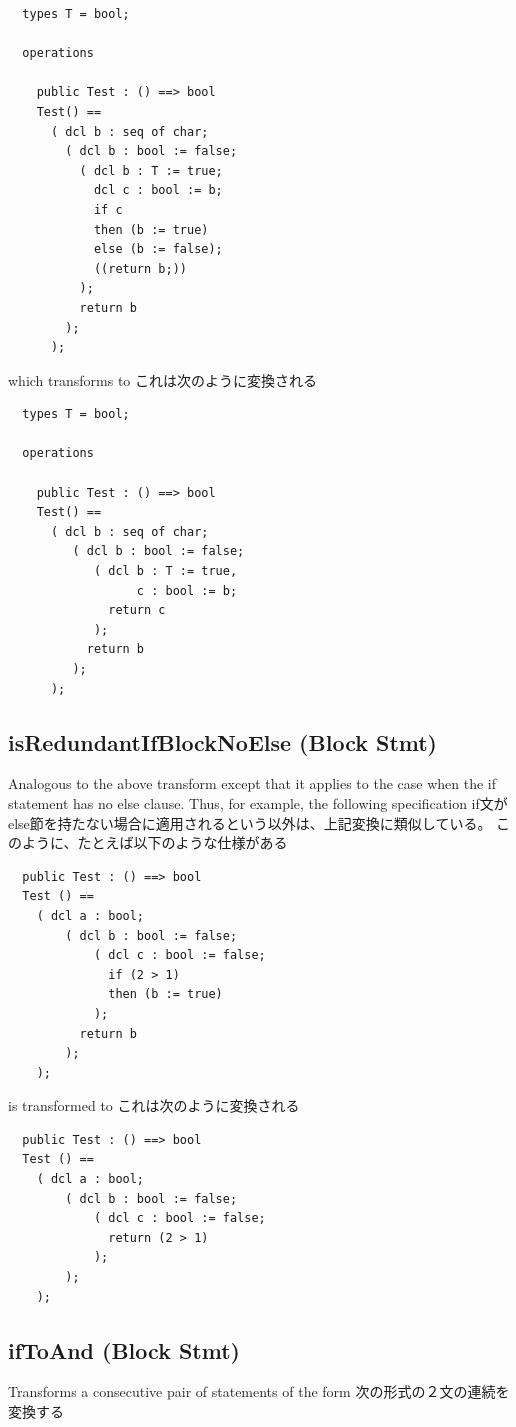 \documentclass[\pformat,12pt]{jarticle}
\begin{document}
\begin{verbatim}
  types T = bool;

  operations

    public Test : () ==> bool  
    Test() ==
      ( dcl b : seq of char;
        ( dcl b : bool := false;
          ( dcl b : T := true;
            dcl c : bool := b;
            if c
            then (b := true)
            else (b := false);
            ((return b;))
          );
          return b
        );
      );
\end{verbatim}

which transforms to
これは次のように変換される

\begin{verbatim}
  types T = bool;

  operations

    public Test : () ==> bool  
    Test() ==
      ( dcl b : seq of char;
         ( dcl b : bool := false;
            ( dcl b : T := true,
                  c : bool := b;
              return c
            );
           return b 
         ); 
      );
\end{verbatim}


\subsection{isRedundantIfBlockNoElse (Block Stmt)}
  Analogous to the above transform except that it applies to the case
  when the if statement has no else clause. Thus, for example, the
  following specification
if文がelse節を持たない場合に適用されるという以外は、上記変換に類似している。
このように、たとえば以下のような仕様がある

\begin{verbatim}
  public Test : () ==> bool  
  Test () ==
    ( dcl a : bool;
        ( dcl b : bool := false;
            ( dcl c : bool := false;
              if (2 > 1)
              then (b := true)
            );          
          return b
        );
    );
\end{verbatim}

is transformed to
これは次のように変換される

\begin{verbatim}
  public Test : () ==> bool  
  Test () ==
    ( dcl a : bool;
        ( dcl b : bool := false;
            ( dcl c : bool := false;
              return (2 > 1)
            );
        );
    );
\end{verbatim}

\subsection{ifToAnd (Block Stmt)}
  Transforms a consecutive pair of statements of the form
  次の形式の２文の連続を変換する
\end{document}
